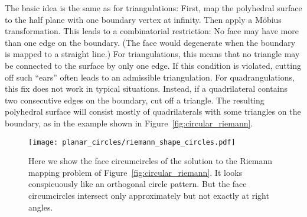 \documentclass[Thesis]{subfiles}
\begin{document}
The basic idea is the same as for triangulations: First, map the
polyhedral surface to the half plane with one boundary vertex at
infinity. Then apply a M{\"o}bius transformation. This leads to a
combinatorial restriction: No face may have more than one edge on the
boundary. (The face would degenerate when the boundary is mapped to a
straight line.) For triangulations, this means that no triangle may be
connected to the surface by only one edge. If this condition is
violated, cutting off such ``ears'' often leads to an admissible
triangulation. For quadrangulations, this fix does not work in typical
situations. Instead, if a quadrilateral contains two consecutive edges
on the boundary, cut off a triangle. The resulting polyhedral surface
will consist mostly of quadrilaterals with some triangles on the
boundary, as in the example shown in Figure~\ref{fig:circular_riemann}.

\begin{figure}
  \centering
  \texttt{[image: planar\_circles/riemann\_shape\_circles.pdf]}
  \caption{Here we show the face circumcircles of the solution to the
    Riemann mapping problem of Figure~\ref{fig:circular_riemann}. It
    looks conspicuously like an orthogonal circle pattern. But the
    face circumcircles intersect only approximately but not exactly at
    right angles.}
  \label{fig:riemann_circles}
\end{figure}

\end{document}
